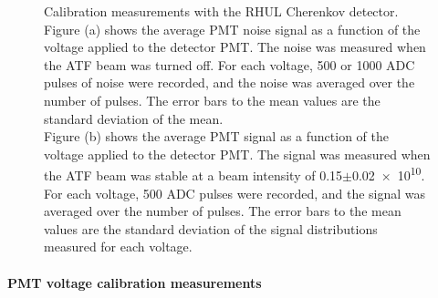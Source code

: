 \begin{figure}
{Calibration measurements with the RHUL Cherenkov detector.
\\Figure (a) shows the average PMT noise signal as a function of the voltage applied to the detector PMT.
The noise was measured when the ATF beam was turned off. 
For each voltage, 500 or 1000 ADC pulses of noise were recorded, and the noise was averaged over the number of pulses. 
The error bars to the mean values are the standard deviation of the mean.
\\Figure (b) shows the average PMT signal as a function of the voltage applied to the detector PMT. 
The signal was measured when the ATF beam was stable at a beam intensity of \num[detect-all]{0.15}$\pm$\num[detect-all]{0.02e10}. 
For each voltage, 500 ADC pulses were recorded, and the signal was averaged over the number of pulses. 
The error bars to the mean values are the standard deviation of the signal distributions measured for each voltage.}
\label{fig:AverageNoise_VoltageNormalization}
\end{figure}

\paragraph{PMT voltage calibration measurements}

